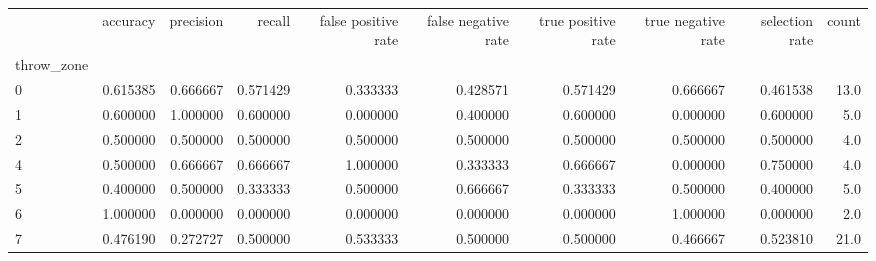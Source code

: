 \begin{tabular}{lrrrrrrrrr}
\toprule
{} &  accuracy &  precision &    recall &  false positive rate &  false negative rate &  true positive rate &  true negative rate &  selection rate &  count \\
throw\_zone &           &            &           &                      &                      &                     &                     &                 &        \\
\midrule
0          &  0.615385 &   0.666667 &  0.571429 &             0.333333 &             0.428571 &            0.571429 &            0.666667 &        0.461538 &   13.0 \\
1          &  0.600000 &   1.000000 &  0.600000 &             0.000000 &             0.400000 &            0.600000 &            0.000000 &        0.600000 &    5.0 \\
2          &  0.500000 &   0.500000 &  0.500000 &             0.500000 &             0.500000 &            0.500000 &            0.500000 &        0.500000 &    4.0 \\
4          &  0.500000 &   0.666667 &  0.666667 &             1.000000 &             0.333333 &            0.666667 &            0.000000 &        0.750000 &    4.0 \\
5          &  0.400000 &   0.500000 &  0.333333 &             0.500000 &             0.666667 &            0.333333 &            0.500000 &        0.400000 &    5.0 \\
6          &  1.000000 &   0.000000 &  0.000000 &             0.000000 &             0.000000 &            0.000000 &            1.000000 &        0.000000 &    2.0 \\
7          &  0.476190 &   0.272727 &  0.500000 &             0.533333 &             0.500000 &            0.500000 &            0.466667 &        0.523810 &   21.0 \\
\bottomrule
\end{tabular}
